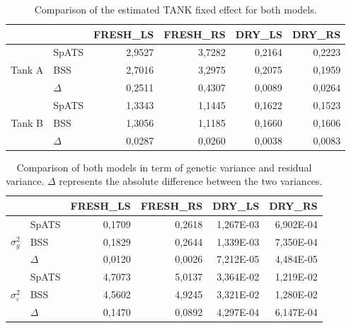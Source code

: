 \begin{table}[htbp]
  \centering
  \caption{Comparison of the estimated TANK fixed effect for both models.}
    \begin{tabular}{clrrrr}
    \toprule
          &       & \multicolumn{1}{l}{FRESH\_LS} & \multicolumn{1}{l}{FRESH\_RS} & \multicolumn{1}{l}{DRY\_LS} & \multicolumn{1}{l}{DRY\_RS} \\
    \midrule
    \multirow{3}[1]{*}{Tank A} & SpATS & 2,9527 & 3,7282 & 0,2164 & 0,2223 \\
          & BSS   & 2,7016 & 3,2975 & 0,2075 & 0,1959 \\
          & $\Delta$ & 0,2511 & 0,4307 & 0,0089 & 0,0264 \\
    \midrule
    \multirow{3}[1]{*}{Tank B} & SpATS & 1,3343 & 1,1445 & 0,1622 & 0,1523 \\
          & BSS   & 1,3056 & 1,1185 & 0,1660 & 0,1606 \\
          & $\Delta$ & 0,0287 & 0,0260 & 0,0038 & 0,0083 \\
    \bottomrule
    \end{tabular}%

  \label{tab:tank_effect_model_comparison}%
\end{table}%


\begin{table}[htbp]
  \centering
  \caption[Comparison of both models in term of genetic variance and residual variance]{Comparison of both models in term of genetic variance and residual variance. $\Delta$ represents the absolute difference between the two variances. }
    \begin{tabular}{clrrrr}
    \toprule
          &       & \multicolumn{1}{l}{FRESH\_LS} & \multicolumn{1}{l}{FRESH\_RS} & \multicolumn{1}{l}{DRY\_LS} & \multicolumn{1}{l}{DRY\_RS} \\
    \midrule
    \multirow{3}[2]{*}{$\sigma^2_{g}$} & SpATS & 0,1709 & 0,2618 & 1,267E-03 & 6,902E-04 \\
          & BSS   & 0,1829 & 0,2644 & 1,339E-03 & 7,350E-04 \\
          & $\Delta$ & 0,0120 & 0,0026 & 7,212E-05 & 4,484E-05 \\
    \midrule
    \multirow{3}[2]{*}{$\sigma^2_{\varepsilon}$} & SpATS & 4,7073 & 5,0137 & 3,364E-02 & 1,219E-02 \\
          & BSS   & 4,5602 & 4,9245 & 3,321E-02 & 1,280E-02 \\
          & $\Delta$ & 0,1470 & 0,0892 & 4,297E-04 & 6,147E-04 \\
    \bottomrule
    \end{tabular}%

  \label{tab:sigma_model_comparison}%
\end{table}%

